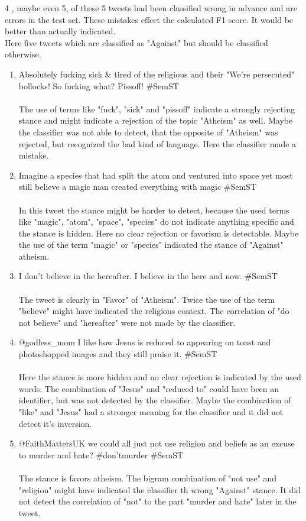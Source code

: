 \documentclass[a4paper,12pt,twoside]{article}
\begin{document}
4 , maybe even 5, of these 5 tweets had been classified wrong in advance and are errors in the test set. These mistakes effect the calculated F1 score. It would be better than actually indicated.\\
Here five tweets which are classified as "Against" but should be classified otherwise.
\\
\begin{enumerate}
\item Absolutely fucking sick \& tired of the religious and their "We're persecuted" bollocks! So fucking what? Pissoff! \#SemST\\
\\
The use of terms like "fuck", "sick" and "pissoff" indicate a strongly rejecting stance and might indicate a rejection of the topic "Atheism" as well. Maybe the classifier was not able to detect, that the opposite of "Atheism" was rejected, but recognized the bad kind of language. Here the classifier made a mistake. 
\\
\item Imagine a species that had split the atom and ventured into space yet most still believe a magic man created everything with magic \#SemST\\
\\
In this tweet the stance might be harder to detect, because the used terms like "magic", "atom", "space", "species" do not indicate anything specific and the stance is hidden. Here no clear rejection or favorism is detectable. Maybe the use of the term "magic" or "species" indicated the stance of "Against" atheism. 
\\
\item I don't believe in the hereafter.  I believe in the here and now. \#SemST\\
\\
The tweet is clearly in "Favor" of "Atheism". Twice the use of the term "believe" might have indicated the religious context. The correlation of "do not believe" and "hereafter" were not made by the classifier.
\\
\item @godless\_mom I like how Jesus is reduced to appearing on toast and photoshopped images and they still praise it. \#SemST \\
\\
Here the stance is more hidden and no clear rejection is indicated by the used words. The combination of "Jesus" and "reduced to" could have been an identifier, but was not detected by the classifier. Maybe the combination of "like" and "Jesus" had a stronger meaning for the classifier and it did not detect it's inversion.
\\
\item @FaithMattersUK we could all just not use religion and beliefs as an excuse to murder and hate? \#don'tmurder \#SemST\\
\\
The stance is favors atheism. The bigram combination of "not use" and "religion" might have indicated the classifier th wrong "Against" stance. It did not detect the correlation of "not" to the part "murder and hate" later in the tweet.
\\
\end{enumerate} 
\end{document}
